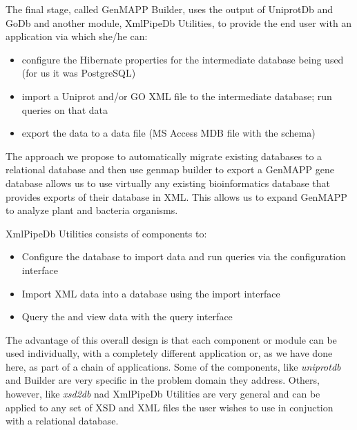 The final stage, called GenMAPP Builder, uses the output of UniprotDb and GoDb and another module, XmlPipeDb Utilities, to provide the end user with an application via which she/he can: 
\begin{itemize}
	\item {configure the Hibernate properties for the intermediate database being used (for us it was PostgreSQL)}
	\item {import a Uniprot and/or GO XML file to the intermediate database; run queries on that data}
	\item {export the data to a \genmapp data file (MS Access MDB file with the \genmapp schema)}
\end{itemize}


The approach we propose to automatically migrate existing databases to a relational database and then use genmap builder to export a GenMAPP gene database allows us to use virtually any existing bioinformatics database that provides exports of their database in XML.  This allows us to expand GenMAPP to analyze plant and bacteria organisms.  

XmlPipeDb Utilities consists of components to:
 \begin{itemize}
	\item {Configure the database to import data and run queries via the configuration interface}
	\item {Import XML data into a database using the import interface}
	\item {Query the and view data with the query interface}
\end{itemize}

The advantage of this overall design is that each component or module can be used individually, with a completely different application or, as we have done here, as part of a chain of applications. Some of the components, like \emph{uniprotdb} and \genmapp Builder are very specific in the problem domain they address. Others, however, like \emph{xsd2db} nad XmlPipeDb Utilities are very general and can be applied to any set of XSD and XML files the user wishes to use in conjuction with a relational database.

